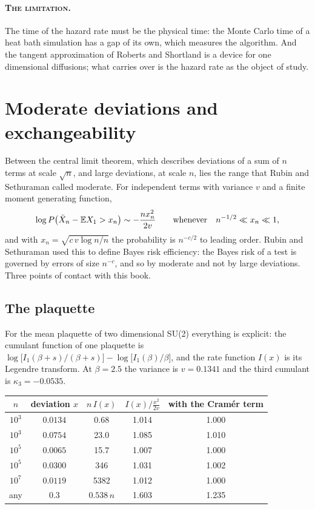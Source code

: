 \paragraph{\normalfont\scshape The limitation.} The time of the hazard rate must be the physical time: the Monte Carlo time of a heat bath simulation has a gap of its own, which measures the algorithm. And the tangent approximation of Roberts and Shortland is a device for one dimensional diffusions; what carries over is the hazard rate as the object of study.

\section{Moderate deviations and exchangeability}

Between the central limit theorem, which describes deviations of a sum of $n$ terms at scale $\sqrt n$, and large deviations, at scale $n$, lies the range that Rubin and Sethuraman called moderate. For independent terms with variance $v$ and a finite moment generating function,
\[
\log P\big(\bar X_n-\mathbb{E} X_1>x_n\big)\sim-\frac{n x_n^2}{2v}\qquad\text{whenever}\quad n^{-1/2}\ll x_n\ll1,
\]
and with $x_n=\sqrt{c\,v\log n/n}$ the probability is $n^{-c/2}$ to leading order. Rubin and Sethuraman used this to define Bayes risk efficiency: the Bayes risk of a test is governed by errors of size $n^{-c}$, and so by moderate and not by large deviations. Three points of contact with this book.

\subsection*{The plaquette}

For the mean plaquette of two dimensional SU(2) everything is explicit: the cumulant function of one plaquette is $\log\big[I_1(\beta+s)/(\beta+s)\big]-\log\big[I_1(\beta)/\beta\big]$, and the rate function $I(x)$ is its Legendre transform. At $\beta=2.5$ the variance is $v=0.1341$ and the third cumulant is $\kappa_3=-0.0535$.

\begin{center}
\small
\begin{tabular}{ccccc}
\toprule
$n$ & deviation $x$ & $n\,I(x)$ & $I(x)\big/\frac{x^2}{2v}$ & with the Cram\'er term \\ \midrule
$10^3$ & $0.0134$ & 0.68 & 1.014 & 1.000 \\
$10^3$ & $0.0754$ & 23.0 & 1.085 & 1.010 \\
$10^5$ & $0.0065$ & 15.7 & 1.007 & 1.000 \\
$10^5$ & $0.0300$ & 346 & 1.031 & 1.002 \\
$10^7$ & $0.0119$ & 5382 & 1.012 & 1.000 \\
any & $0.3$ & $0.538\,n$ & 1.603 & 1.235 \\
\bottomrule
\end{tabular}
\end{center}

